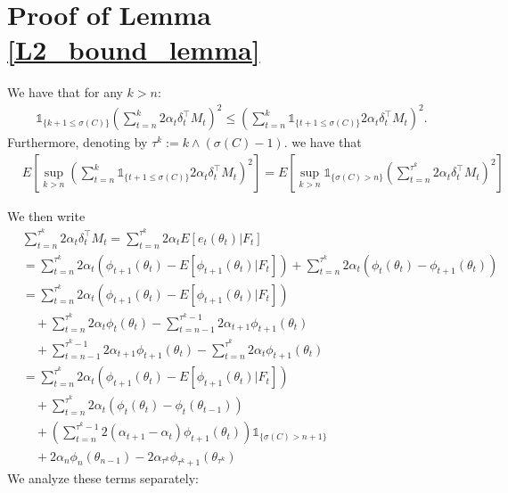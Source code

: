 \documentclass[11pt]{article}
\begin{document}
\section{Proof of Lemma \ref{L2_bound_lemma}}\label{L2_bound_lemma_proof}


We have that for any $k>n$:
\begin{align*}
 \mathds{1}_{\{k+1 \leq \sigma(C)\}}\left(\sum_{t=n}^{k} 2\alpha_t \delta_t^\intercal M_t\right)^2\leq \left(\sum_{t=n}^{k} \mathds{1}_{\{t+1\leq \sigma(C)\}}2\alpha_t \delta_t^\intercal M_t\right)^2.
\end{align*}
Furthermore,  denoting by $\tau^k:=k \wedge (\sigma(C)-1)$. we have that 
\begin{align*}
&E\left[\sup_{k>n} \left(\sum_{t=n}^{k} \mathds{1}_{\{t+1\leq \sigma(C)\}}2\alpha_t \delta_t^\intercal M_t\right)^2  \right]=E\left[\sup_{k>n} \mathds{1}_{\{\sigma(C)>n\}} \left(\sum_{t=n}^{\tau^k} 2\alpha_t \delta_t^\intercal M_t\right)^2  \right]
\end{align*}

We then write
\begin{align*}
& \sum_{t=n}^{\tau^k} 2\alpha_t \delta_t^\intercal M_t  = \sum_{t=n}^{\tau^k}2\alpha_t E[e_t(\theta_t)|F_t]\\
& = \sum_{t=n}^{\tau^k}2\alpha_t \left(\phi_{t+1}(\theta_t)-E[\phi_{t+1}(\theta_t)|F_t]\right) + \sum_{t=n}^{\tau^k}2\alpha_t \left(\phi_t(\theta_t) - \phi_{t+1}(\theta_t)\right)\\
& = \sum_{t=n}^{\tau^k}2\alpha_t \left(\phi_{t+1}(\theta_t)-E[\phi_{t+1}(\theta_t)|F_t]\right) \\
& \quad+  \sum_{t=n}^{\tau^k} 2\alpha_t \phi_t(\theta_t) - \sum_{t=n-1}^{\tau^k-1} 2\alpha_{t+1} \phi_{t+1}(\theta_t)\\
& \quad +  \sum_{t=n-1}^{\tau^k-1}2\alpha_{t+1} \phi_{t+1}(\theta_t) -   \sum_{t=n}^{\tau^k} 2\alpha_t \phi_{t+1}(\theta_t) \\
& = \sum_{t=n}^{\tau^k}2\alpha_t \left(\phi_{t+1}(\theta_t)-E[\phi_{t+1}(\theta_t)|F_t]\right) \\
&\quad + \sum_{t=n}^{\tau^k} 2\alpha_t \left( \phi_t(\theta_t) -\phi_t(\theta_{t-1}) \right)\\
&\quad +  \left(\sum_{t=n}^{\tau^k-1}2(\alpha_{t+1}-\alpha_t) \phi_{t+1}(\theta_t)\right) \mathds{1}_{\{ \sigma(C)>n+1\}} \\
&\quad + 2\alpha_n \phi_n(\theta_{n-1}) - 2\alpha_{\tau^k} \phi_{\tau^k+1}(\theta_{\tau^k}) 
\end{align*}
We analyze these terms separately:
\end{document}
